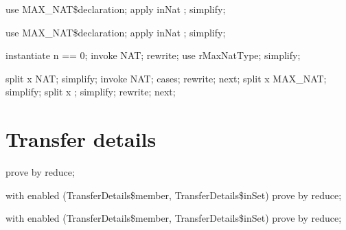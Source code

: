 \begin{LPScript}\begin{zproof}[rMaxNatType]
    use MAX\_NAT\$declaration;
    apply inNat ;
    simplify;
\end{zproof}\end{LPScript}

\begin{LPScript}\begin{zproof}[rMaxNatType2]
    use MAX\_NAT\$declaration;
    apply inNat ;
    simplify;
\end{zproof}\end{LPScript}

\begin{LPScript}\begin{zproof}[tNATConsistency]
    instantiate n == 0;
    invoke NAT;
    rewrite;
    use rMaxNatType;
    simplify;
\end{zproof}\end{LPScript}

\begin{LPScript}\begin{zproof}[rInNAT]
    split x \in NAT;
    simplify;
    invoke NAT;
    cases;
    rewrite;
    next;
    split x \leq MAX\_NAT;
    simplify;
    split \lnot x ;
    simplify;
    rewrite;
    next;
\end{zproof}\end{LPScript}

\section{Transfer details}


\begin{LPScript}\begin{zproof}[fTransferDetailsValueType]
    prove by reduce;
\end{zproof}\end{LPScript}

\begin{LPScript}\begin{zproof}[fTransferDetailsMemberMaxType]
    with enabled (TransferDetails\$member, TransferDetails\$inSet) prove by reduce;
\end{zproof}\end{LPScript}

\begin{LPScript}\begin{zproof}[fTransferDetailsMember]
    with enabled (TransferDetails\$member, TransferDetails\$inSet) prove by reduce;
\end{zproof}\end{LPScript}

